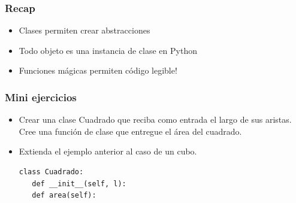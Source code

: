 \documentclass[14pt,aspectratio=169,xcolor=dvipsnames]{beamer}
\begin{document}
\begin{frame}\frametitle{Recap}
    \begin{itemize}
        \item Clases permiten crear abstracciones
        \item Todo objeto es una instancia de clase en Python
        \item Funciones mágicas permiten código legible!
    \end{itemize}
\end{frame}
\begin{frame}
    \maketitle
\end{frame}
\begin{frame}\frametitle{Mini ejercicios}
    \begin{itemize}
        \item Crear una clase Cuadrado que reciba como entrada el largo de sus aristas. Cree una función de clase que entregue el área del cuadrado.
        \item Extienda el ejemplo anterior al caso de un cubo.
    \begin{footnotesize}
    \begin{verbatim}
class Cuadrado:
   def __init__(self, l):
   def area(self):
    \end{verbatim}
    \end{footnotesize}

    \end{itemize}
\end{frame}
\end{document}
